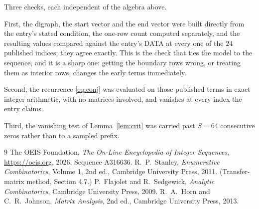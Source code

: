 \documentclass[11pt,a4paper]{article}
\theoremstyle{plain}
\theoremstyle{definition}
\begin{document}
Three checks, each independent of the algebra above.

First, the digraph, the start vector and the end vector were built directly from the
entry's stated condition, the one-row count computed separately, and the resulting values
compared against the entry's DATA at every one of the $24$ published indices; they
agree exactly. This is the check that ties the model to the sequence, and it is a sharp one:
getting the boundary rows wrong, or treating them as interior rows, changes the early terms
immediately.

Second, the recurrence \eqref{eq:conj} was evaluated on those published terms in exact
integer arithmetic, with no matrices involved, and vanishes at every index the entry claims.

Third, the vanishing test of Lemma~\ref{lem:crit} was carried past $S=64$ consecutive
zeros rather than to a sampled prefix.

\begin{thebibliography}{9}
 The OEIS Foundation, \emph{The On-Line Encyclopedia of Integer
Sequences}, \url{https://oeis.org}, 2026. Sequence A316636.
 R.~P.~Stanley, \emph{Enumerative Combinatorics}, Volume 1, 2nd ed.,
Cambridge University Press, 2011. (Transfer-matrix method, Section 4.7.)
 P.~Flajolet and R.~Sedgewick, \emph{Analytic Combinatorics}, Cambridge
University Press, 2009.
 R.~A.~Horn and C.~R.~Johnson, \emph{Matrix Analysis}, 2nd ed., Cambridge
University Press, 2013.
\end{thebibliography}
\end{document}
